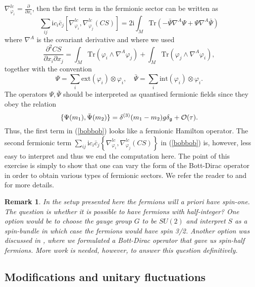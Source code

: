 \documentclass[letterpaper,12pt]{article}
\def\d{\delta}
\def\co{{\cal O}}
\newcommand{\pa}{\partial}
\newtheorem{remark}{Remark}
\begin{document}
$
\nabla^{lc}_{\varphi_i} = \frac{\pa}{\pa x_i}
$,
then the first term in the fermionic sector can be written as
$$
\sum_{ij} \mathrm{i} c_i \bar{c}_j \left[\nabla^{lc}_{\varphi_i}, \nabla^{lc}_{\varphi_j}(CS)\right]=2\mathrm{i}\int_M \mbox{Tr}\left(-\bar{\Psi}\nabla^A \Psi + \Psi \nabla^A \bar{\Psi} \right)
$$
where $\nabla^A$ is the covariant derivative and where we used
$$
 \frac{\pa^2 CS}{\pa x_{i } \pa x_{j }} 
 =    \int_M \mbox{Tr} \left(  \varphi_{i  }  \wedge \nabla^A  \varphi_{j} \right) + \int_M \mbox{Tr} \left(  \varphi_{j  }  \wedge \nabla^A  \varphi_{i} \right)   ,   
$$
together with the convention
$$
\Psi = \sum_i \mbox{ext}(\varphi_i)\otimes \varphi_i , \quad \bar{\Psi} = \sum_i \mbox{int}(\varphi_i)\otimes \varphi_i .
$$
The operators $\Psi, \bar{\Psi}$ should be interpreted as quantised fermionic fields since they obey the relation
$$
\{\Psi(m_1), \bar{\Psi}(m_2)\} = \d^{(3)}(m_1-m_2)g \d_{\mathfrak{g}} + \co(\tau).
$$
Thus, the first term in (\ref{bobbob}) looks like a fermionic Hamilton operator.
The second fermionic term 
$ \sum_{ij} \mathrm{i} c_i \bar{c}_j   \left\{\nabla^{lc}_{\varphi_i}, \nabla^{lc}_{\varphi_j}(CS)\right\} $ in (\ref{bobbob}) is, however, less easy to interpret and thus we end the computation here. The point of this exercise is simply to show that one can vary the form of the Bott-Dirac operator in order to obtain various types of fermionic sectors. We refer the reader to \cite{Aastrup:2020jcf} and \cite{Aastrup:2017atr} for more details.





\begin{remark}
In the setup presented here the fermions will a priori have spin-one. The question is whether it is possible to have fermions with half-integer? One option would be to choose the gauge group $G$ to be $SU(2)$ and interpret $S$ as a spin-bundle in which case the fermions would have spin 3/2. Another option was discussed in \cite{Aastrup:2020jcf}, where we formulated a Bott-Dirac operator that gave us spin-half fermions. More work is needed, however, to answer this question definitively.
\end{remark}










\subsection{Modifications and unitary fluctuations}
\end{document}
